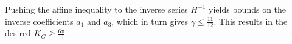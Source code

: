 Pushing the affine inequality to the inverse series $H^{-1}$ yields bounds on the inverse coefficients $a_1$ and $a_3$, which in turn gives $\gamma \leq \frac{11}{12}$. This results in the desired $K_G \geq \frac{6\pi}{11}$ .













